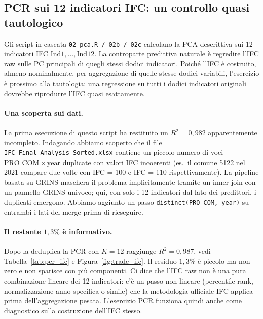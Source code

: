 \documentclass[11pt,a4paper]{article}
\begin{document}
\subsection{PCR sui 12 indicatori IFC: un controllo quasi tautologico}

Gli script in cascata \texttt{02\_pca.R / 02b / 02c} calcolano la
PCA descrittiva sui 12 indicatori IFC
\(\mathrm{Ind1},\dots,\mathrm{Ind12}\). La controparte predittiva
naturale è regredire l'IFC raw sulle PC principali di quegli
stessi dodici indicatori. Poiché l'IFC è costruito, almeno
nominalmente, per aggregazione di quelle stesse dodici variabili,
l'esercizio è prossimo alla tautologia: una regressione su tutti i
dodici indicatori originali dovrebbe riprodurre l'IFC quasi
esattamente.

\paragraph{Una scoperta sui dati.}
La prima esecuzione di questo script ha restituito un
\(R^{2} = 0{,}982\) apparentemente incompleto. Indagando abbiamo
scoperto che il file
\texttt{IFC\_Final\_Analysis\_Sorted.xlsx} contiene un piccolo
numero di voci \(\mathrm{PRO\_COM} \times \mathrm{year}\)
duplicate con valori IFC incoerenti (es.\ il comune 5122 nel 2021
compare due volte con IFC = 100 e IFC = 110 rispettivamente). La
pipeline basata su GRINS maschera il problema implicitamente
tramite un inner join con un pannello GRINS univoco; qui, con solo
i 12 indicatori dal lato dei predittori, i duplicati emergono.
Abbiamo aggiunto un passo \verb|distinct(PRO_COM, year)| su
entrambi i lati del merge prima di rieseguire.

\paragraph{Il restante \(1{,}3\%\) è informativo.}
Dopo la deduplica la PCR con \(K = 12\) raggiunge
\(R^{2} = 0{,}987\), vedi Tabella~\ref{tab:pcr_ifc} e
Figura~\ref{fig:trade_ifc}. Il residuo \(1{,}3\%\) è piccolo ma
non zero e non sparisce con più componenti. Ci dice che l'IFC raw
non è una pura combinazione lineare dei 12 indicatori: c'è un
passo non-lineare (percentile rank, normalizzazione anno-specifica
o simile) che la metodologia ufficiale IFC applica prima
dell'aggregazione pesata. L'esercizio PCR funziona quindi anche
come diagnostico sulla costruzione dell'IFC stesso.
\end{document}
